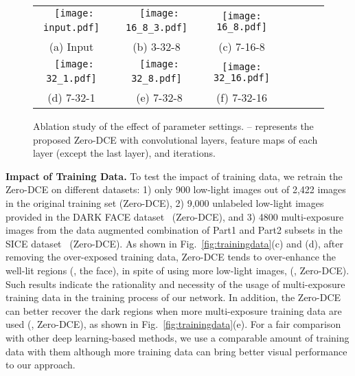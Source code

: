 \documentclass[10pt,twocolumn,letterpaper]{article}
\begin{document}
\begin{figure}
	\begin{center}
		\begin{tabular}{c@{ }c@{ }c@{ }c@{ }c@{ }c@{ }c}
			\texttt{[image: input.pdf]}~&
			\texttt{[image: 16\_8\_3.pdf]}~&
			\texttt{[image: 16\_8.pdf]}\\
			(a) Input~& (b) 3-32-8~& (c) 7-16-8\\
			\texttt{[image: 32\_1.pdf]}~&
			\texttt{[image: 32\_8.pdf]}~&
			\texttt{[image: 32\_16.pdf]}\\
			(d) 7-32-1~& (e) 7-32-8 & (f) 7-32-16\\
		\end{tabular}
	\end{center}
	\vspace{-0.5cm}
	\caption{Ablation study of the effect of parameter settings. -- represents the proposed Zero-DCE with  convolutional layers,  feature maps of each layer (except the last layer), and  iterations.}
	\label{fig:parameter}
	\vspace{-0.7cm}
\end{figure}



\noindent
\textbf{Impact of Training Data.}
To test the impact of training data, we retrain the Zero-DCE on  different datasets: 1) only 900 low-light images out of 2,422 images in the original training set (Zero-DCE), 2) 9,000 unlabeled low-light images provided in the DARK FACE dataset~\cite{2019arXiv190404474Y} (Zero-DCE), and 3) 4800 multi-exposure images from the data augmented combination of Part1 and Part2 subsets in the SICE dataset~\cite{Cai2018} (Zero-DCE).
As shown in Fig.~\ref{fig:trainingdata}(c) and (d), after removing the over-exposed training data, Zero-DCE tends to over-enhance the well-lit regions (\eg, the face), in spite of using more low-light images, (\ie, Zero-DCE). Such results indicate the rationality and necessity of the usage of multi-exposure training data in the training process of our network.  In addition, the Zero-DCE can better recover the dark regions when more multi-exposure training data are used (\ie, Zero-DCE), as shown in Fig.~\ref{fig:trainingdata}(e). For a fair comparison with other deep learning-based methods, we use a comparable amount of training data with them although more training data can bring better visual performance to our approach.
\end{document}
